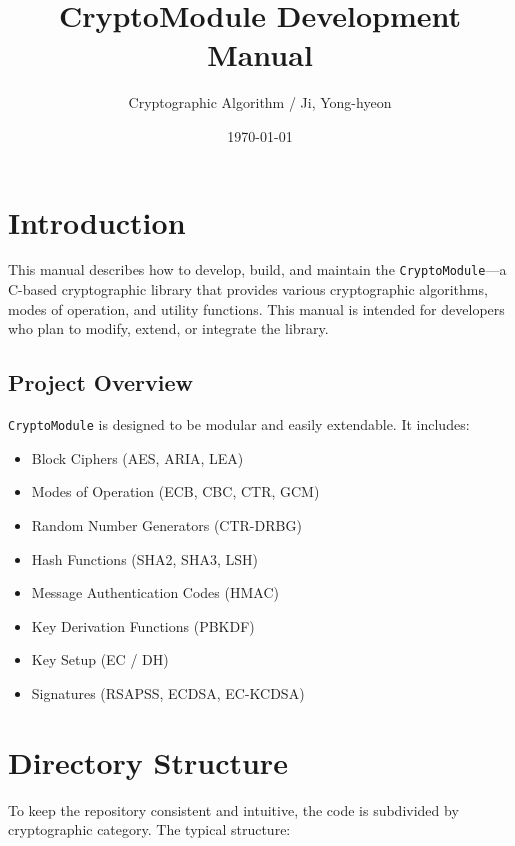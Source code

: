 \documentclass[12pt,a4paper]{article}
\title{\textbf{CryptoModule Development Manual}}
\author{Cryptographic Algorithm / Ji, Yong-hyeon}
\date{\today}
\begin{document}
\maketitle

\tableofcontents
\clearpage

\section{Introduction}
\label{sec:introduction}
This manual describes how to develop, build, and maintain the \texttt{CryptoModule}---a C-based cryptographic library that provides various cryptographic algorithms, modes of operation, and utility functions. This manual is intended for developers who plan to modify, extend, or integrate the library.

\subsection{Project Overview}
\texttt{CryptoModule} is designed to be modular and easily extendable. It includes:
\begin{itemize}
    \item Block Ciphers (AES, ARIA, LEA)
    \item Modes of Operation (ECB, CBC, CTR, GCM)
    \item Random Number Generators (CTR-DRBG)
    \item Hash Functions (SHA2, SHA3, LSH)
    \item Message Authentication Codes (HMAC)
    \item Key Derivation Functions (PBKDF)
    \item Key Setup (EC / DH)
    \item Signatures (RSAPSS, ECDSA, EC-KCDSA)
\end{itemize}

\section{Directory Structure}
\label{sec:directory-structure}
To keep the repository consistent and intuitive, the code is subdivided by cryptographic category. The typical structure:
\end{document}

